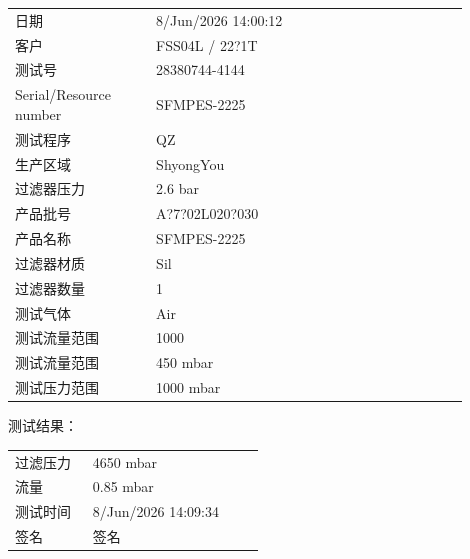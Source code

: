 \documentclass[UTF8,10pt,a4paper,fontset=fandol]{ctexart}
\newcommand{\fieldvalue}[1]{#1}
\newcommand{\handwritten}[1]{#1}
\begin{document}
\begin{tabular}{@{}p{0.28\linewidth}p{0.62\linewidth}@{}}
日期 &
\fieldvalue{8/Jun/2026 14:00:12}
\\
客户 &
\fieldvalue{FSS04L / 22?1T}
\\
测试号 &
\fieldvalue{28380744-4144}
\\
Serial/Resource number &
\fieldvalue{SFMPES-2225}
\\
测试程序 &
\fieldvalue{QZ}
\\
生产区域 &
\fieldvalue{ShyongYou}
\\
过滤器压力 &
\fieldvalue{2.6 bar}
\\
产品批号 &
\fieldvalue{A?7?02L020?030}
\\
产品名称 &
\fieldvalue{SFMPES-2225}
\\
过滤器材质 &
\fieldvalue{Sil}
\\
过滤器数量 &
\fieldvalue{1}
\\
测试气体 &
\fieldvalue{Air}
\\
测试流量范围 &
\fieldvalue{1000}
\\
测试流量范围 &
\fieldvalue{450 mbar}
\\
测试压力范围 &
\fieldvalue{1000 mbar}
\end{tabular}

\bigskip

\noindent
测试结果：

\begin{tabular}{@{}p{0.28\linewidth}p{0.62\linewidth}@{}}
过滤压力 &
\fieldvalue{4650 mbar}
\\
流量 &
\fieldvalue{0.85 mbar}
\\
测试时间 &
\fieldvalue{8/Jun/2026 14:09:34}
\\
签名 &
\fieldvalue{\handwritten{签名}}
\end{tabular}
\end{document}
